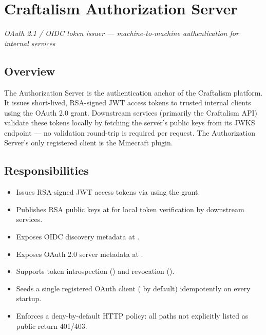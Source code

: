 

\chapter{Craftalism Authorization Server}
\label{ch:authorization-server}


\textcolor{CraftGray}{\textit{OAuth 2.1 / OIDC token issuer — machine-to-machine authentication for internal services}}

\bigskip

\section{Overview}

The Authorization Server is the authentication anchor of the Craftalism platform. It issues short-lived, RSA-signed JWT access tokens to trusted internal clients using the OAuth 2.0  grant. Downstream services (primarily the Craftalism API) validate these tokens locally by fetching the server's public keys from its JWKS endpoint — no validation round-trip is required per request. The Authorization Server's only registered client is the Minecraft plugin.

\section{Responsibilities}

\begin{itemize}
  \item Issues RSA-signed JWT access tokens via  using the  grant.
  \item Publishes RSA public keys at  for local token verification by downstream services.
  \item Exposes OIDC discovery metadata at .
  \item Exposes OAuth 2.0 server metadata at .
  \item Supports token introspection () and revocation ().
  \item Seeds a single registered OAuth client ( by default) idempotently on every startup.
  \item Enforces a deny-by-default HTTP policy: all paths not explicitly listed as public return 401/403.
\end{itemize}

